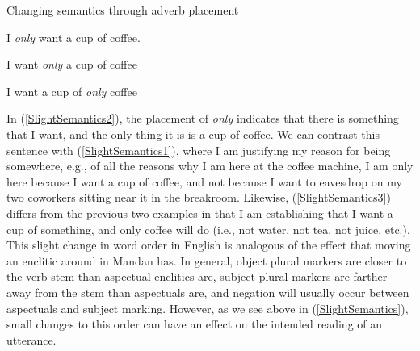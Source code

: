 \begin{exe}

\item\label{SlightSemantics} Changing semantics through adverb placement

    \begin{xlist}
    
    \item\label{SlightSemantics1} I \textit{only} want a cup of coffee.
    
    \item\label{SlightSemantics2} I want \textit{only} a cup of coffee
    
    \item\label{SlightSemantics3} I want a cup of \textit{only} coffee
    
    \end{xlist}

\end{exe}

In (\ref{SlightSemantics2}), the placement of \textit{only} indicates that there is something that I want, and the only thing it is is a cup of coffee. We can contrast this sentence with (\ref{SlightSemantics1}), where I am justifying my reason for being somewhere, e.g., of all the reasons why I am here at the coffee machine, I am only here because I want a cup of coffee, and not because I want to eavesdrop on my two coworkers sitting near it in the breakroom. Likewise, (\ref{SlightSemantics3}) differs from the previous two examples in that I am establishing that I want a cup of something, and only coffee will do (i.e., not water, not tea, not juice, etc.). This slight change in word order in English is analogous of the effect that moving an enclitic around in Mandan has. In general, object plural markers are closer to the verb stem than aspectual enclitics are, subject plural markers are farther away from the stem than aspectuals are, and negation will usually occur between aspectuals and subject marking. However, as we see above in (\ref{SlightSemantics}), small changes to this order can have an effect on the intended reading of an utterance.

